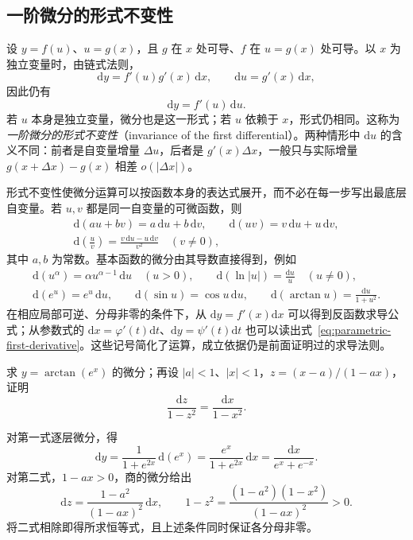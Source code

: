 \documentclass[UTF8,12pt,a4paper,fontset=fandol]{ctexbook}
\begin{document}
\subsection{一阶微分的形式不变性}
\label{subsec:invariance-of-first-differentials}

设 $y=f(u)$、$u=g(x)$，且 $g$ 在 $x$ 处可导、$f$ 在 $u=g(x)$ 处可导。以 $x$ 为独立变量时，由链式法则，
\[
    \mathrm dy=f'(u)g'(x)\,\mathrm dx,
    \qquad \mathrm du=g'(x)\,\mathrm dx,
\]
因此仍有
\begin{equation}
\label{eq:invariance-of-first-differential}
    \mathrm dy=f'(u)\,\mathrm du.
\end{equation}
若 $u$ 本身是独立变量，微分也是这一形式；若 $u$ 依赖于 $x$，形式仍相同。这称为\emph{一阶微分的形式不变性}（invariance of the first differential）。两种情形中 $\mathrm du$ 的含义不同：前者是自变量增量 $\Delta u$，后者是 $g'(x)\Delta x$，一般只与实际增量 $g(x+\Delta x)-g(x)$ 相差 $o(|\Delta x|)$。

形式不变性使微分运算可以按函数本身的表达式展开，而不必在每一步写出最底层自变量。若 $u,v$ 都是同一自变量的可微函数，则
\begin{equation}
\label{eq:differential-arithmetic-rules}
\begin{gathered}
    \mathrm d(au+bv)=a\,\mathrm du+b\,\mathrm dv,\qquad
    \mathrm d(uv)=v\,\mathrm du+u\,\mathrm dv,\\
    \mathrm d\left(\frac uv\right)
    =\frac{v\,\mathrm du-u\,\mathrm dv}{v^2}\quad(v\ne0),
\end{gathered}
\end{equation}
其中 $a,b$ 为常数。基本函数的微分由其导数直接得到，例如
\[
\begin{gathered}
    \mathrm d(u^\alpha)=\alpha u^{\alpha-1}\,\mathrm du\quad(u>0),\qquad
    \mathrm d(\ln|u|)=\frac{\mathrm du}u\quad(u\ne0),\\
    \mathrm d(e^u)=e^u\,\mathrm du,\qquad
    \mathrm d(\sin u)=\cos u\,\mathrm du,\qquad
    \mathrm d(\arctan u)=\frac{\mathrm du}{1+u^2}.
\end{gathered}
\]
在相应局部可逆、分母非零的条件下，从 $\mathrm dy=f'(x)\mathrm dx$ 可以得到反函数求导公式；从参数式的 $\mathrm dx=\varphi'(t)\mathrm dt$、$\mathrm dy=\psi'(t)\mathrm dt$ 也可以读出式~\eqref{eq:parametric-first-derivative}。这些记号简化了运算，成立依据仍是前面证明过的求导法则。

\begin{example}
\label{ex:differentials-of-composite-and-fractional-functions}
求 $y=\arctan(e^x)$ 的微分；再设 $|a|<1$、$|x|<1$，$z=(x-a)/(1-ax)$，证明
\[
    \frac{\mathrm dz}{1-z^2}=\frac{\mathrm dx}{1-x^2}.
\]
\end{example}
\begin{solve}
对第一式逐层微分，得
\[
    \mathrm dy=\frac1{1+e^{2x}}\,\mathrm d(e^x)
    =\frac{e^x}{1+e^{2x}}\,\mathrm dx
    =\frac{\mathrm dx}{e^x+e^{-x}}.
\]
对第二式，$1-ax>0$，商的微分给出
\[
    \mathrm dz=\frac{1-a^2}{(1-ax)^2}\,\mathrm dx,
    \qquad
    1-z^2=\frac{(1-a^2)(1-x^2)}{(1-ax)^2}>0.
\]
将二式相除即得所求恒等式，且上述条件同时保证各分母非零。
\end{solve}
\end{document}
